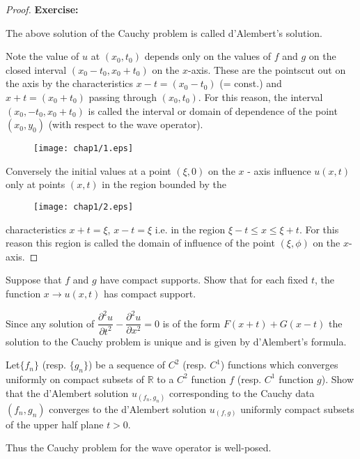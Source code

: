\begin{proof}
{\bf Exercise:}

The above solution of the Cauchy problem is called d'Alembert's solution.

Note the value of $u$ at $(x_{0},t_{0})$ depends only on the values of $f$ and $g$ on the closed interval $(x_{0}-t_{0}, x_{0}+t_{0})$ on the $x$-axis. These are the points\pageoriginale cut out on the axis by the characteristics $x-t=(x_{0}-t_{0})$ (= const.) and $x+t=(x_{0}+t_{0})$ passing through $(x_{0},t_{0})$. For this reason, the interval $(x_{0},-t_{0},x_{0}+t_{0})$ is called the interval or domain of dependence of the point $(x_{0},y_{0})$ (with respect to the wave operator).
\begin{figure}[H]
\centering
\texttt{[image: chap1/1.eps]}
\end{figure}

Conversely the initial values at a point $(\xi,0)$ on the $x$ - axis influence $u(x,t)$ only at points $(x,t)$ in the region bounded by the
\begin{figure}[H]
\centering
\texttt{[image: chap1/2.eps]}
\end{figure}
\noindent
characteristics $x+t=\xi$, $x-t=\xi$ i.e. in the region $\xi-t\leq x\leq \xi+t$. For this reason this region is called the domain of influence of the point $(\xi,\phi)$ on the $x$-axis.
\end{proof}

\begin{exer*}
Suppose that $f$ and $g$ have compact supports. Show that for each fixed $t$, the function $x\to u(x,t)$ has compact support.
\end{exer*}

Since any solution of $\dfrac{\partial^{2}u}{\partial t^{2}}-\dfrac{\partial^{2}u}{\partial x^{2}}=0$ is of the form $F(x+t)+G(x-t)$ the solution to the Cauchy problem is unique and is given by d'Alembert's formula.

\begin{exer*}
Let\pageoriginale $\{f_{n}\}$ (resp. $\{g_{n}\}$) be a sequence of $C^{2}$ (resp. $C^{1}$) functions which converges uniformly on compact subsets of $\mathbb{R}$ to a $C^{2}$ function $f$ (resp. $C^{1}$ function $g$). Show that the d'Alembert solution $u_{(f_{n},g_{n})}$ corresponding to the Cauchy data $(f_{n},g_{n})$ converges to the d'Alembert solution $u_{(f,g)}$ uniformly compact subsets of the upper half plane $t>0$.
\end{exer*}

Thus the Cauchy problem for the wave operator is well-posed.

